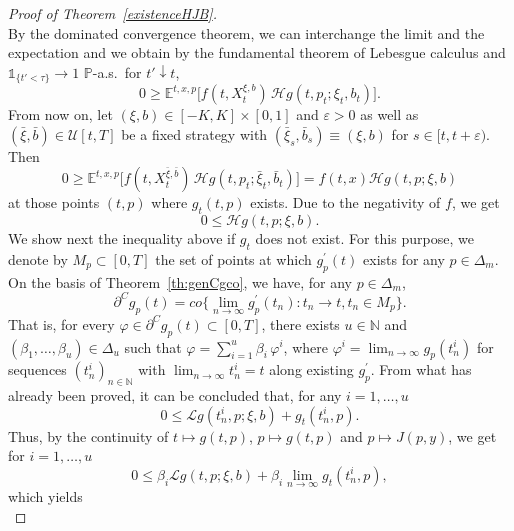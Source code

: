 \documentclass[reqno, 11pt]{amsart}%
\newcommand{\N}{\mathbb{N}}
\newcommand{\Eop}{\mathbb{E}}
\newcommand{\Pop}{\mathbb{P}}
\newcommand{\indicator}{{\mathds 1}}
\newcommand{\Ind}[1]{\indicator_{\{#1\}}}
\newcommand{\xib}{(\xi,b)}
\theoremstyle{definition}
\numberwithin{equation}{section} \numberwithin{theorem}{section}
\begin{document}
\begin{proof}[Proof of Theorem~\ref{existenceHJB}]
\begin{equation*}
   \end{equation*}
   By the dominated convergence theorem, we can interchange the limit and the expectation and we obtain by the fundamental theorem of Lebesgue calculus and $\Ind{t'<\tau}\to1$ $\Pop$-a.s.\ for $t'\downarrow t$, 
   \begin{equation*}
   0\ge \Eop^{t,x,p}\bigg[f(t,X^{\xi,b}_t)\,\mathcal{H}g(t,p_t;\xi_t,b_t)\bigg].
   \end{equation*}
   From now on, let $\xib\in[-K,K]\times[0,1]$ and $\varepsilon>0$ as well as $(\bar{\xi},\bar{b})\in \mathcal U[t,T]$ be a fixed strategy with $(\bar{\xi}_s,\bar{b}_s)\equiv(\xi,b)$ for $s\in[t,t+\varepsilon)$. Then
   \begin{equation*}
   0\ge \Eop^{t,x,p}\bigg[f(t,X^{\bar{\xi},\bar{b}}_t)\,\mathcal{H}g(t,p_t;\bar{\xi}_t,\bar{b}_t)\bigg] = f(t,x)\mathcal{H}g(t,p;\xi,b)
   \end{equation*}
   at those points $(t,p)$ where $g_t(t,p)$ exists. Due to the negativity of $f$, we get
   \begin{equation*}
   0\le \mathcal{H}g(t,p;\xi,b).
   \end{equation*}
   We show next the inequality above if $g_t$ does not exist. For this purpose, we denote by $M_p\subset[0,T]$ the set of points at which $g_p^\prime(t)$ exists for any $p\in\Delta_m$. On the basis of Theorem~\ref{th:genCgco}, we have, for any $p\in\Delta_m$, 
   \begin{equation*}
   \partial^C g_p(t) = co\Big\{\lim_{n\to\infty} g_p^\prime(t_n): t_n\to t, t_n\in M_p\Big\}.
   \end{equation*}
   That is, for every $\varphi\in\partial^C g_p(t)\subset[0,T]$, there exists $u\in\N$ and $(\beta_1,\ldots,\beta_u)\in\Delta_u$ such that $\varphi = \sum_{i=1}^u \beta_i\,\varphi^i$, where $\varphi^i = \lim_{n\to\infty} g_p(t_n^i)$ for sequences $(t_n^i)_{n\in\N}$ with $\lim_{n\to\infty}t_n^i=t$ along existing $g_p^\prime$. From what has already been proved, it can be concluded that, for any $i=1,\ldots,u$
   \begin{equation*}
   0 \le \mathcal{L}g(t_n^i,p;\xi,b)+g_t(t_n^i,p).
   \end{equation*}
   Thus, by the continuity of $t\mapsto g(t,p)$, $p\mapsto g(t,p)$ and $p\mapsto J(p,y)$, we get for $i=1,\ldots, u$
   \begin{equation*}
   0 \le \beta_i\mathcal{L}g(t,p;\xi,b)+\beta_i\lim_{n\to\infty}g_t(t_n^i,p), 
   \end{equation*}
   which yields
   \begin{equation*}

\end{equation*}
\end{proof}
\end{document}
